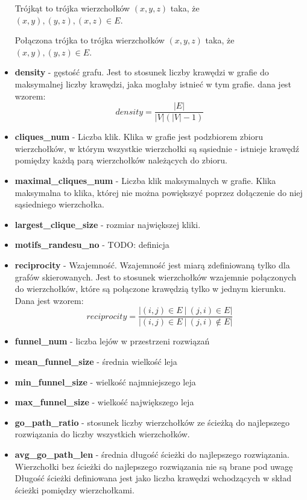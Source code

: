 \begin{itemize}
            Trójkąt to trójka wierzchołków $(x,y,z)$ taka, że $(x,y), (y,z), (x,z) \in E$.

            Połączona trójka to trójka wierzchołków $(x,y,z)$ taka, że $(x,y), (y,z) \in E$.

      \item \textbf{density} - gęstość grafu. Jest to stosunek liczby krawędzi w grafie do maksymalnej liczby krawędzi, jaka mogłaby istnieć w tym grafie.
            dana jest wzorem:
            $$density = \frac{|E|}{|V|(|V|-1)}$$

      \item \textbf{cliques\_num} - Liczba klik. Klika w grafie jest podzbiorem zbioru wierzchołków, w którym wszystkie wierzchołki są sąsiednie - istnieje krawędź pomiędzy każdą parą wierzchołków należących do zbioru.
      \item \textbf{maximal\_cliques\_num} - Liczba klik maksymalnych w grafie. Klika maksymalna to klika, której nie można powiększyć poprzez dołączenie do niej sąsiedniego wierzchołka.
      \item \textbf{largest\_clique\_size} - rozmiar największej kliki.
      \item \textbf{motifs\_randesu\_no} - TODO: definicja
      \item \textbf{reciprocity} - Wzajemność. Wzajemność jest miarą zdefiniowaną tylko dla grafów skierowanych. Jest to stosunek wierzchołków wzajemnie połączonych do wierzchołków, które są połączone krawędzią tylko w jednym kierunku.
            Dana jest wzorem:
            $$reciprocity = \frac{ |(i, j) \in E  \: | \: (j, i) \in E| }{|(i, j) \in E  \: | \: (j, i) \notin E| }$$
      \item \textbf{funnel\_num} - liczba lejów w przestrzeni rozwiązań
      \item \textbf{mean\_funnel\_size} - średnia wielkość leja
      \item \textbf{min\_funnel\_size} - wielkość najmniejszego leja
      \item \textbf{max\_funnel\_size} - wielkość największego leja
      \item \textbf{go\_path\_ratio} - stosunek liczby wierzchołków ze ścieżką do najlepszego rozwiązania do liczby wszystkich wierzchołków.
      \item \textbf{avg\_go\_path\_len} - średnia długość ścieżki do najlepszego rozwiązania. Wierzchołki bez ścieżki do najlepszego rozwiązania nie są brane pod uwagę
            Długość ścieżki definiowana jest jako liczba krawędzi wchodzących w skład ścieżki pomiędzy wierzchołkami.

\end{itemize}
